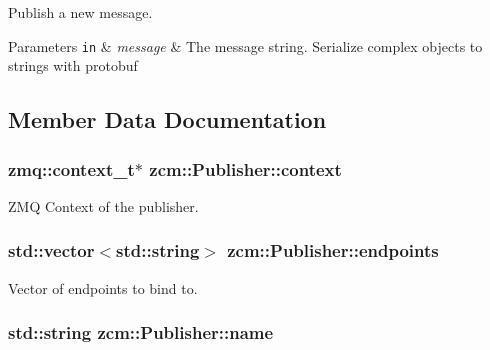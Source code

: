 Publish a new message. 


\begin{DoxyParams}[1]{Parameters}
\mbox{\tt in}  & {\em message} & The message string. Serialize complex objects to strings with protobuf \\
\hline
\end{DoxyParams}


\subsection{Member Data Documentation}
\hypertarget{classzcm_1_1Publisher_a399965216cd17f1097313f044487d968}{
\subsubsection[{context}]{\setlength{\rightskip}{0pt plus 5cm}zmq\-::context\-\_\-t$\ast$ zcm\-::\-Publisher\-::context\hspace{0.3cm}{\ttfamily [private]}}}\label{classzcm_1_1Publisher_a399965216cd17f1097313f044487d968}


Z\-M\-Q Context of the publisher. 

\hypertarget{classzcm_1_1Publisher_a34548b5f2611391263acd10cb7d197e5}{
\subsubsection[{endpoints}]{\setlength{\rightskip}{0pt plus 5cm}std\-::vector$<$std\-::string$>$ zcm\-::\-Publisher\-::endpoints\hspace{0.3cm}{\ttfamily [private]}}}\label{classzcm_1_1Publisher_a34548b5f2611391263acd10cb7d197e5}


Vector of endpoints to bind to. 

\hypertarget{classzcm_1_1Publisher_a2e3902339b55647dc6a7d2f3de64d8fe}{
\subsubsection[{name}]{\setlength{\rightskip}{0pt plus 5cm}std\-::string zcm\-::\-Publisher\-::name\hspace{0.3cm}{\ttfamily [private]}}}\label{classzcm_1_1Publisher_a2e3902339b55647dc6a7d2f3de64d8fe}


